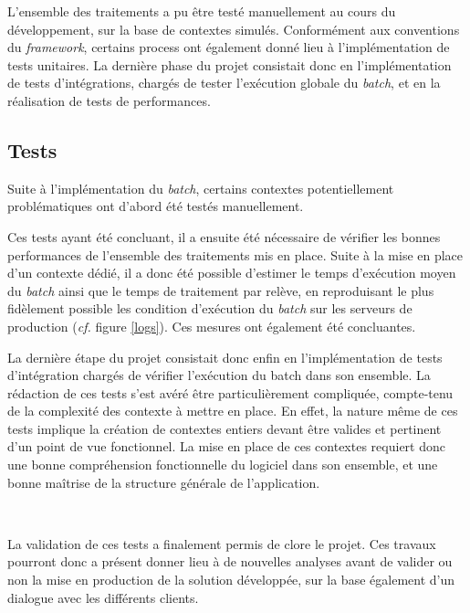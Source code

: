 \documentclass[a4paper, 12pt]{report}
\begin{document}
L'ensemble des traitements a pu être testé manuellement au cours du développement, sur la base de contextes simulés. Conformément aux conventions du \textit{framework}, certains process ont également donné lieu à l'implémentation de tests unitaires. La dernière phase du projet consistait donc en l'implémentation de tests d'intégrations, chargés de tester l'exécution globale du \textit{batch}, et en la réalisation de tests de performances.

\subsection{Tests}

Suite à l'implémentation du \textit{batch}, certains contextes potentiellement problématiques ont d'abord été testés manuellement. 

Ces tests ayant été concluant, il a ensuite été nécessaire de vérifier les bonnes performances de l'ensemble des traitements mis en place. Suite à la mise en place d'un contexte dédié, il a donc été possible d'estimer le temps d'exécution moyen du \textit{batch} ainsi que le temps de traitement par relève, en reproduisant le plus fidèlement possible les condition d'exécution du \textit{batch} sur les serveurs de production (\textit{cf.} figure \ref{logs}). Ces mesures ont également été concluantes.

La dernière étape du projet consistait donc enfin en l'implémentation de tests d'intégration chargés de vérifier l'exécution du batch dans son ensemble. La rédaction de ces tests s'est avéré être particulièrement compliquée, compte-tenu de la complexité des contexte à mettre en place. En effet, la nature même de ces tests implique la création de contextes entiers devant être valides et pertinent d'un point de vue fonctionnel. La mise en place de ces contextes requiert donc une bonne compréhension fonctionnelle du logiciel dans son ensemble, et une bonne maîtrise de la structure générale de l'application.\\

\begin{center}
\noindent*\\
\end{center}

La validation de ces tests a finalement permis de clore le projet. Ces travaux pourront donc a présent donner lieu à de nouvelles analyses avant de valider ou non la mise en production de la solution développée, sur la base également d'un dialogue avec les différents clients.
\end{document}

